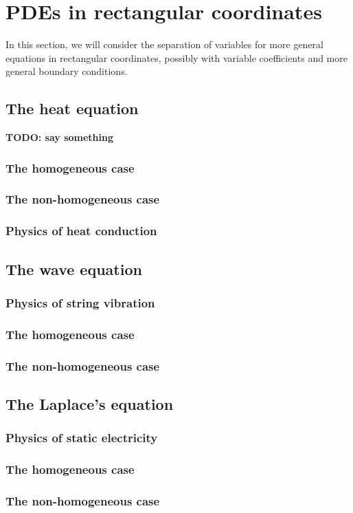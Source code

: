 \section{PDEs in rectangular coordinates}

In this section, we will consider the separation of variables for more general equations in rectangular coordinates, possibly with variable coefficients and more general boundary conditions. 

\subsection{The heat equation}

\textbf{TODO: say something}

\subsubsection{The homogeneous case}

\subsubsection{The non-homogeneous case}

\subsubsection{Physics of heat conduction}

\subsection{The wave equation}

\subsubsection{Physics of string vibration}

\subsubsection{The homogeneous case}

\subsubsection{The non-homogeneous case}


\subsection{The Laplace's equation}

\subsubsection{Physics of static electricity}

\subsubsection{The homogeneous case}

\subsubsection{The non-homogeneous case}